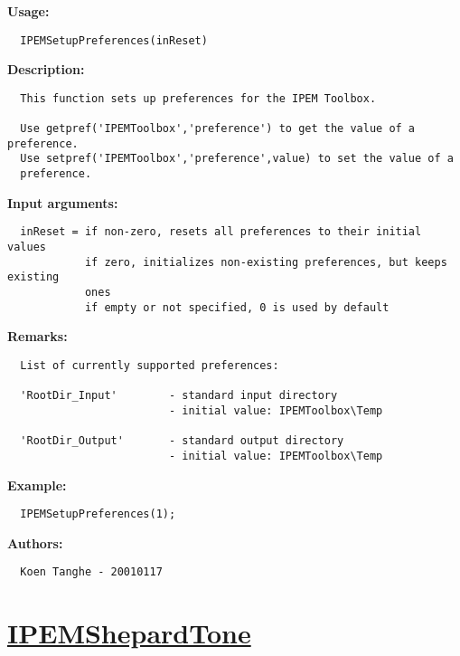 \textbf{Usage:}
\begin{verbatim}  IPEMSetupPreferences(inReset)

\end{verbatim}
\textbf{Description:}
\begin{verbatim}  This function sets up preferences for the IPEM Toolbox.

  Use getpref('IPEMToolbox','preference') to get the value of a preference.
  Use setpref('IPEMToolbox','preference',value) to set the value of a
  preference.

\end{verbatim}
\textbf{Input arguments:}
\begin{verbatim}  inReset = if non-zero, resets all preferences to their initial values
            if zero, initializes non-existing preferences, but keeps existing
            ones
            if empty or not specified, 0 is used by default

\end{verbatim}
\textbf{Remarks:}
\begin{verbatim}  List of currently supported preferences:

  'RootDir_Input'        - standard input directory
                         - initial value: IPEMToolbox\Temp
    
  'RootDir_Output'       - standard output directory
                         - initial value: IPEMToolbox\Temp

\end{verbatim}
\textbf{Example:}
\begin{verbatim}  IPEMSetupPreferences(1);

\end{verbatim}
\textbf{Authors:}
\begin{verbatim}  Koen Tanghe - 20010117
\end{verbatim}


\newpage
\section*{\hyperlink{Concepts:IPEMShepardTone}{IPEMShepardTone}}
\hypertarget{FuncRef:IPEMShepardTone}{}

